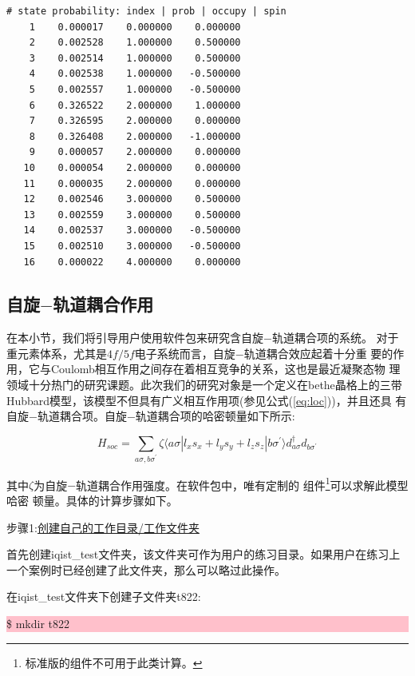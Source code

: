 \begin{lstlisting}[frame=single]
# state probability: index | prob | occupy | spin
    1    0.000017    0.000000    0.000000
    2    0.002528    1.000000    0.500000
    3    0.002514    1.000000    0.500000
    4    0.002538    1.000000   -0.500000
    5    0.002557    1.000000   -0.500000
    6    0.326522    2.000000    1.000000
    7    0.326595    2.000000    0.000000
    8    0.326408    2.000000   -1.000000
    9    0.000057    2.000000    0.000000
   10    0.000054    2.000000    0.000000
   11    0.000035    2.000000    0.000000
   12    0.002546    3.000000    0.500000
   13    0.002559    3.000000    0.500000
   14    0.002537    3.000000   -0.500000
   15    0.002510    3.000000   -0.500000
   16    0.000022    4.000000    0.000000
\end{lstlisting}

\subsection{自旋$-$轨道耦合作用}
\label{subsec:soc}

在本小节，我们将引导用户使用{\iqist}软件包来研究含自旋$-$轨道耦合项的系统。
对于重元素体系，尤其是$4f/5f$电子系统而言，自旋$-$轨道耦合效应起着十分重
要的作用，它与Coulomb相互作用之间存在着相互竞争的关系，这也是最近凝聚态物
理领域十分热门的研究课题。此次我们的研究对象是一个定义在bethe晶格上的三带
Hubbard模型，该模型不但具有广义相互作用项(参见公式(\ref{eq:loc}))，并且还具
有自旋$-$轨道耦合项。自旋$-$轨道耦合项的哈密顿量如下所示:

\begin{equation}
\label{eqn:soc}
H_{soc}=\sum_{a\sigma,b\sigma^{\prime}} \zeta 
\langle a\sigma | l_{x}s_{x} + l_{y}s_{y} + l_{z}s_{z} | b\sigma^{\prime} \rangle 
d_{a\sigma}^{\dagger}d_{b\sigma^{\prime}}
\end{equation}

其中$\zeta$为自旋$-$轨道耦合作用强度。在{\iqist}软件包中，唯有定制的{\lavender}
组件\footnote{标准版的{\lavender}组件不可用于此类计算。}可以求解此模型哈密
顿量。具体的计算步骤如下。

步骤1:\underline{创建自己的工作目录/工作文件夹}

首先创建iqist\_test文件夹，该文件夹可作为用户的练习目录。如果用户在练习上
一个案例时已经创建了此文件夹，那么可以略过此操作。

在iqist\_test文件夹下创建子文件夹t822:

\noindent\colorbox{pink}{\parbox[r]{\linewidth}{\quad \$ mkdir t822 }}

